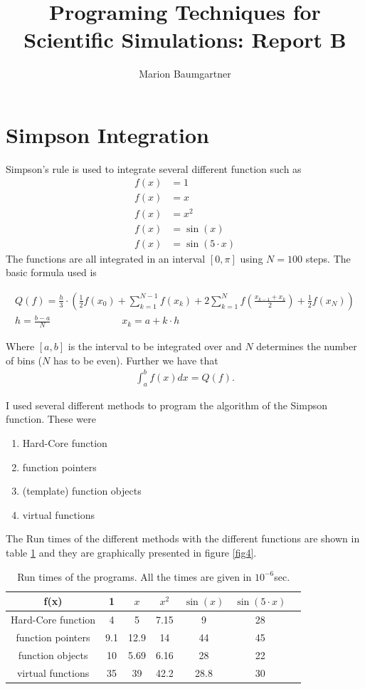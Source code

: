\documentclass[a4paper,10pt]{article}
\title{Programing Techniques for Scientific Simulations: Report B}
\author{Marion Baumgartner}
\begin{document}
\maketitle

\section{Simpson Integration}

Simpson's rule is used to integrate several different function such as 
\begin{align*}
f(x)&=1\\
f(x)&=x\\
f(x)&=x^2\\
f(x)&=\sin(x)\\
f(x)&=\sin(5\cdot x)
\end{align*}
The functions are all integrated in an interval $[0,\pi]$ using $N=100$ steps. The basic formula used is

\begin{align}
\label{simpson}
    Q(f)=\frac{h}{3} \cdot \left( \frac {1}{2} f(x_0)+\sum_{k=1}^{N-1}f(x_k)+2\sum_{k=1}^{N}f \left( \frac{x_{k-1}+x_k}{2} \right)+\frac{1}{2} f(x_N) \right)\\
    h=\frac{b-a}{N} \hspace{3cm} x_k=a+k\cdot h\nonumber
\end{align}

Where $[a,b]$ is the interval to be integrated over and $N$ determines the number of bins ($N$ has to be even). Further we have that
\begin{align}
  \int_{a}^{b}f(x)dx=Q(f).
\end{align}


I used several different methods to program the algorithm of the Simpson function. These were
\begin{enumerate}
\item Hard-Core function
\item function pointers
\item (template) function objects
\item virtual functions
\end{enumerate}
The Run times of the different methods with the different functions are shown in table \ref{tabel1} and they are graphically presented in figure \ref{fig4}.



\begin{table}
\centering
  \begin{tabular}{|c|c|c|c|c|c|c|} \hline
f(x)&	1&	$x$&	$x^2$&	$\sin(x)$&	$\sin(5\cdot x)$\\ \hline\hline
Hard-Core function&		4	&5	&7.15	&9	&28\\ \hline
function pointers		&9.1	&12.9	&14	&44	&45 \\ \hline
function objects		&10	&5.69	&6.16	&28	&22 \\ \hline
virtual functions		&35	&39	&42.2	&28.8	&30 \\ \hline
  \end{tabular}
  \caption{Run times of the programs. All the times are given in $10^{-6}$sec.}
  \label{tabel1}
\end{table}
\end{document}
